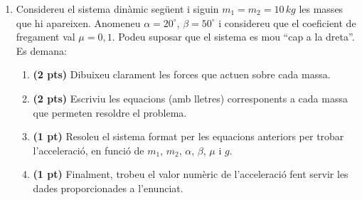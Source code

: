 \documentclass[a4paper,12pt]{article}
\begin{document}
\begin{enumerate}
\begin{center}
\end{center}
\clearpage
\item
Considereu el sistema dinàmic següent i siguin $m_{1}=m_{2}=10\,kg$ les masses que hi apareixen. Anomeneu $\alpha=20^{\circ}$, $\beta=50^{\circ}$ i considereu que el coeficient de fregament val $\mu=0,1$. Podeu suposar que el sistema es mou ``cap a la dreta''. Es demana: 
\begin{enumerate}
\item 
\textbf{(2 pts)} Dibuixeu clarament les forces que actuen sobre cada massa.
\item
\textbf{(2 pts)} Escriviu les equacions (amb lletres) corresponents a cada massa que permeten resoldre el problema.
\item
\textbf{(1 pt)} Resoleu el sistema format per les equacions anteriors per trobar l'acceleració, en funció de $m_{1}$, $m_{2}$, $\alpha$, $\beta$, $\mu$ i $g$.
\item
\textbf{(1 pt)}
Finalment, trobeu el valor numèric de l'acceleració fent servir les dades proporcionades a l'enunciat. 
\end{enumerate}


\end{enumerate}
\end{document}
